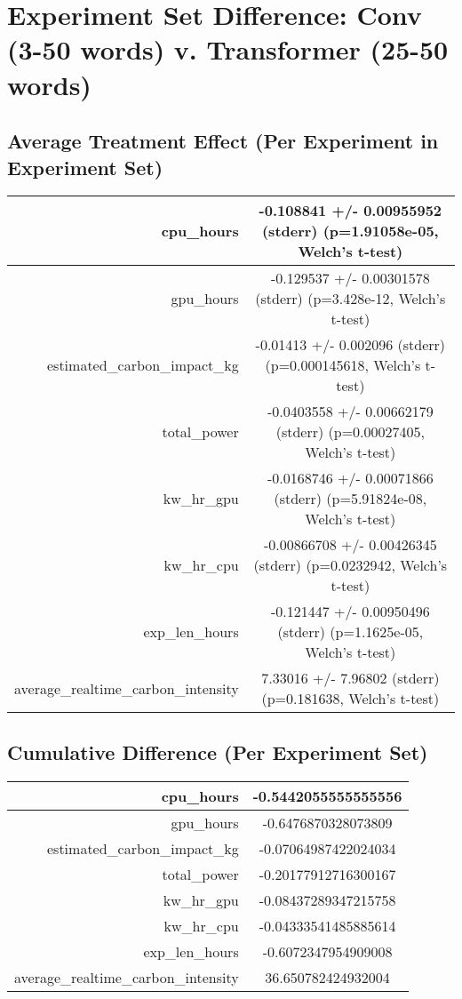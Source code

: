 \documentclass{article}%
\begin{document}
%
\normalsize%
\section{Experiment Set Difference: Conv (3{-}50 words) v. Transformer (25{-}50 words)}%
\label{sec:Experiment Set Difference Conv (3{-}50 words) v. Transformer (25{-}50 words)}%
\subsection{Average Treatment Effect (Per Experiment in Experiment Set)}%
\label{subsec:Average Treatment Effect (Per Experiment in Experiment Set)}%
\begin{tabular}{|r|c|}%
\hline%
cpu\_hours&{-}0.108841 +/{-} 0.00955952 (stderr) (p=1.91058e{-}05, Welch's t{-}test)\\%
\hline%
gpu\_hours&{-}0.129537 +/{-} 0.00301578 (stderr) (p=3.428e{-}12, Welch's t{-}test)\\%
\hline%
estimated\_carbon\_impact\_kg&{-}0.01413 +/{-} 0.002096 (stderr) (p=0.000145618, Welch's t{-}test)\\%
\hline%
total\_power&{-}0.0403558 +/{-} 0.00662179 (stderr) (p=0.00027405, Welch's t{-}test)\\%
\hline%
kw\_hr\_gpu&{-}0.0168746 +/{-} 0.00071866 (stderr) (p=5.91824e{-}08, Welch's t{-}test)\\%
\hline%
kw\_hr\_cpu&{-}0.00866708 +/{-} 0.00426345 (stderr) (p=0.0232942, Welch's t{-}test)\\%
\hline%
exp\_len\_hours&{-}0.121447 +/{-} 0.00950496 (stderr) (p=1.1625e{-}05, Welch's t{-}test)\\%
\hline%
average\_realtime\_carbon\_intensity&7.33016 +/{-} 7.96802 (stderr) (p=0.181638, Welch's t{-}test)\\%
\hline%
\end{tabular}

%
\subsection{Cumulative Difference (Per Experiment Set)}%
\label{subsec:Cumulative Difference (Per Experiment Set)}%
\begin{tabular}{|r|c|}%
\hline%
cpu\_hours&{-}0.5442055555555556\\%
\hline%
gpu\_hours&{-}0.6476870328073809\\%
\hline%
estimated\_carbon\_impact\_kg&{-}0.07064987422024034\\%
\hline%
total\_power&{-}0.20177912716300167\\%
\hline%
kw\_hr\_gpu&{-}0.08437289347215758\\%
\hline%
kw\_hr\_cpu&{-}0.04333541485885614\\%
\hline%
exp\_len\_hours&{-}0.6072347954909008\\%
\hline%
average\_realtime\_carbon\_intensity&36.650782424932004\\%
\hline%
\end{tabular}

%
\end{document}
